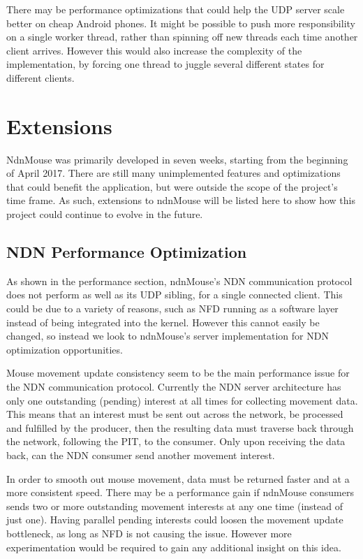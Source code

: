 \documentclass{sig-alternate}
\renewcommand\_{\textunderscore\allowbreak}  %
\begin{document}
There may be performance optimizations that could help the UDP server scale better on cheap Android phones. It might be possible to push more responsibility on a single worker thread, rather than spinning off new threads each time another client arrives. However this would also increase the complexity of the implementation, by forcing one thread to juggle several different states for different clients.

\section{Extensions}
\label{sec:extensions}
NdnMouse was primarily developed in seven weeks, starting from the beginning of April 2017. There are still many unimplemented features and optimizations that could benefit the application, but were outside the scope of the project's time frame. As such, extensions to ndnMouse will be listed here to show how this project could continue to evolve in the future.

\subsection{NDN Performance Optimization}
As shown in the performance section, ndnMouse's NDN communication protocol does not perform as well as its UDP sibling, for a single connected client. This could be due to a variety of reasons, such as NFD running as a software layer instead of being integrated into the kernel. However this cannot easily be changed, so instead we look to ndnMouse's server implementation for NDN optimization opportunities.

Mouse movement update consistency seem to be the main performance issue for the NDN communication protocol. Currently the NDN server architecture has only one outstanding (pending) interest at all times for collecting movement data. This means that an interest must be sent out across the network, be processed and fulfilled by the producer, then the resulting data must traverse back through the network, following the PIT, to the consumer. Only upon receiving the data back, can the NDN consumer send another movement interest.

In order to smooth out mouse movement, data must be returned faster and at a more consistent speed. There may be a performance gain if ndnMouse consumers sends two or more outstanding movement interests at any one time (instead of just one). Having parallel pending interests could loosen the movement update bottleneck, as long as NFD is not causing the issue. However more experimentation would be required to gain any additional insight on this idea.
\end{document}
